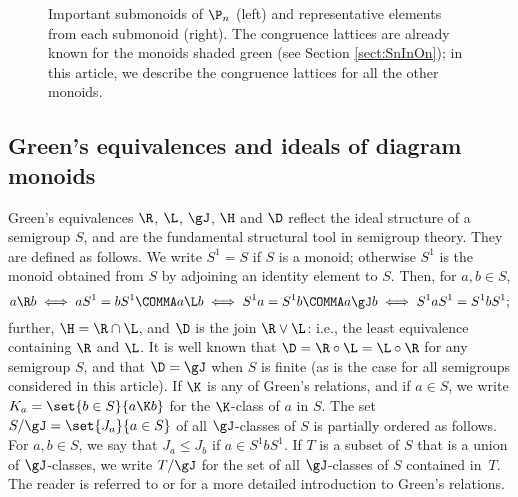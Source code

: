 \begin{figure}[ht]
\begin{center}
\end{center}
\vspace{-5mm}
\caption{Important submonoids of $\P_n$ (left) and representative elements from each submonoid (right). The congruence lattices are already known for the monoids shaded green (see Section \ref{sect:SnInOn}); in this article, we describe the congruence lattices for all the other monoids.}
\label{fig:submonoids}
\end{figure}






\subsection{Green's equivalences and ideals of diagram monoids}
\label{sec:prelim_Green}

Green's equivalences $\R$, $\L$, $\gJ$, $\H$ and $\D$ reflect the ideal
structure of a semigroup $S$, and are the fundamental structural tool in
semigroup theory.  They are defined as follows.  We write $S^1=S$ if $S$ is a monoid; otherwise $S^1$ is the monoid
obtained from $S$ by adjoining an identity element to $S$.  Then, for $a,b\in S$,
\[
a\R b \iff aS^1=bS^1 \COMMA a\L b \iff S^1a=S^1b \COMMA a\gJ b \iff S^1aS^1 = S^1bS^1;
\]
further, ${\H}={\R}\cap{\L}$, and $\D$ is the join ${\R}\vee{\L}$: i.e., the least equivalence containing $\R$ and $\L$.
It is well known that ${\D}={\R}\circ{\L}={\L}\circ{\R}$ for any semigroup $S$, and that ${\D}={\gJ}$ when $S$ is finite (as is the case for all semigroups considered in this article).
%
If $\K$ is any of Green's relations, and if $a\in S$, we write $K_a=\set{b\in S}{a\K b}$ for the $\K$-class of $a$ in $S$.
%
The set $S/{\gJ}=\set{J_a}{a\in S}$ of all $\gJ$-classes of $S$ is partially ordered as follows.
For $a,b\in S$, we say that $J_a\leq J_b$ if $a\in S^1bS^1$.  If $T$ is a subset of $S$ that is a union of $\gJ$-classes, we write $T/{\gJ}$ for the set of all $\gJ$-classes of $S$ contained in~$T$.
%
The reader is referred to \cite[Chapter 2]{Howie} or \cite[Appendix A]{RSbook} for a more detailed introduction to Green's relations.


